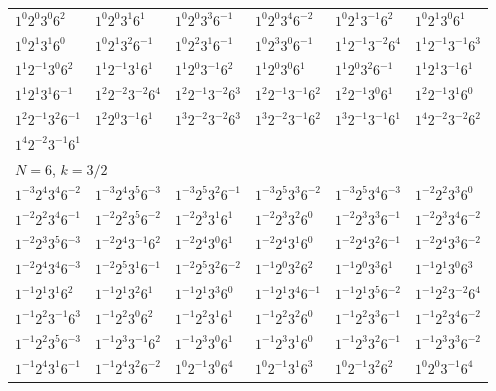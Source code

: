 \documentclass[12pt]{amsart}
\numberwithin{equation}{section}
\theoremstyle{plain}
\theoremstyle{definition}
\theoremstyle{remark}
\begin{document}
\begin{longtable}{llllll}
$1^{0}2^{0}3^{0}6^{2}$ & $1^{0}2^{0}3^{1}6^{1}$ & $1^{0}2^{0}3^{3}6^{-1}$ & $1^{0}2^{0}3^{4}6^{-2}$ & $1^{0}2^{1}3^{-1}6^{2}$ & $1^{0}2^{1}3^{0}6^{1}$\\
$1^{0}2^{1}3^{1}6^{0}$ & $1^{0}2^{1}3^{2}6^{-1}$ & $1^{0}2^{2}3^{1}6^{-1}$ & $1^{0}2^{3}3^{0}6^{-1}$ & $1^{1}2^{-1}3^{-2}6^{4}$ & $1^{1}2^{-1}3^{-1}6^{3}$\\
$1^{1}2^{-1}3^{0}6^{2}$ & $1^{1}2^{-1}3^{1}6^{1}$ & $1^{1}2^{0}3^{-1}6^{2}$ & $1^{1}2^{0}3^{0}6^{1}$ & $1^{1}2^{0}3^{2}6^{-1}$ & $1^{1}2^{1}3^{-1}6^{1}$\\
$1^{1}2^{1}3^{1}6^{-1}$ & $1^{2}2^{-2}3^{-2}6^{4}$ & $1^{2}2^{-1}3^{-2}6^{3}$ & $1^{2}2^{-1}3^{-1}6^{2}$ & $1^{2}2^{-1}3^{0}6^{1}$ & $1^{2}2^{-1}3^{1}6^{0}$\\
$1^{2}2^{-1}3^{2}6^{-1}$ & $1^{2}2^{0}3^{-1}6^{1}$ & $1^{3}2^{-2}3^{-2}6^{3}$ & $1^{3}2^{-2}3^{-1}6^{2}$ & $1^{3}2^{-1}3^{-1}6^{1}$ & $1^{4}2^{-2}3^{-2}6^{2}$\\
$1^{4}2^{-2}3^{-1}6^{1}$ & &&&&\\
\midrule
\multicolumn{6}{l}{$N=6$, $k=3/2$}\\
$1^{-3}2^{4}3^{4}6^{-2}$ & $1^{-3}2^{4}3^{5}6^{-3}$ & $1^{-3}2^{5}3^{2}6^{-1}$ & $1^{-3}2^{5}3^{3}6^{-2}$ & $1^{-3}2^{5}3^{4}6^{-3}$ & $1^{-2}2^{2}3^{3}6^{0}$\\
$1^{-2}2^{2}3^{4}6^{-1}$ & $1^{-2}2^{2}3^{5}6^{-2}$ & $1^{-2}2^{3}3^{1}6^{1}$ & $1^{-2}2^{3}3^{2}6^{0}$ & $1^{-2}2^{3}3^{3}6^{-1}$ & $1^{-2}2^{3}3^{4}6^{-2}$\\
$1^{-2}2^{3}3^{5}6^{-3}$ & $1^{-2}2^{4}3^{-1}6^{2}$ & $1^{-2}2^{4}3^{0}6^{1}$ & $1^{-2}2^{4}3^{1}6^{0}$ & $1^{-2}2^{4}3^{2}6^{-1}$ & $1^{-2}2^{4}3^{3}6^{-2}$\\
$1^{-2}2^{4}3^{4}6^{-3}$ & $1^{-2}2^{5}3^{1}6^{-1}$ & $1^{-2}2^{5}3^{2}6^{-2}$ & $1^{-1}2^{0}3^{2}6^{2}$ & $1^{-1}2^{0}3^{3}6^{1}$ & $1^{-1}2^{1}3^{0}6^{3}$\\
$1^{-1}2^{1}3^{1}6^{2}$ & $1^{-1}2^{1}3^{2}6^{1}$ & $1^{-1}2^{1}3^{3}6^{0}$ & $1^{-1}2^{1}3^{4}6^{-1}$ & $1^{-1}2^{1}3^{5}6^{-2}$ & $1^{-1}2^{2}3^{-2}6^{4}$\\
$1^{-1}2^{2}3^{-1}6^{3}$ & $1^{-1}2^{2}3^{0}6^{2}$ & $1^{-1}2^{2}3^{1}6^{1}$ & $1^{-1}2^{2}3^{2}6^{0}$ & $1^{-1}2^{2}3^{3}6^{-1}$ & $1^{-1}2^{2}3^{4}6^{-2}$\\
$1^{-1}2^{2}3^{5}6^{-3}$ & $1^{-1}2^{3}3^{-1}6^{2}$ & $1^{-1}2^{3}3^{0}6^{1}$ & $1^{-1}2^{3}3^{1}6^{0}$ & $1^{-1}2^{3}3^{2}6^{-1}$ & $1^{-1}2^{3}3^{3}6^{-2}$\\
$1^{-1}2^{4}3^{1}6^{-1}$ & $1^{-1}2^{4}3^{2}6^{-2}$ & $1^{0}2^{-1}3^{0}6^{4}$ & $1^{0}2^{-1}3^{1}6^{3}$ & $1^{0}2^{-1}3^{2}6^{2}$ & $1^{0}2^{0}3^{-1}6^{4}$\\

\end{longtable}
\end{document}
